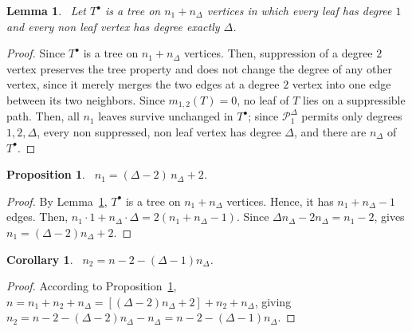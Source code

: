 \documentclass[12pt]{amsart}
\newtheorem{lemma}[theorem]{Lemma}
\newtheorem{proposition}[theorem]{Proposition}
\newtheorem{corollary}[theorem]{Corollary}
\begin{document}
\begin{lemma}~\label{lemreducedtreedegrees501}
Let $T^\bullet$ is a tree on $n_1+n_\Delta$ vertices in which every leaf has degree $1$ and every non leaf vertex has degree exactly $\Delta$.
\end{lemma}
\begin{proof}
Since $T^\bullet$ is a tree on $n_1+n_\Delta$ vertices. Then, suppression of a degree $2$ vertex preserves the tree property and does not change the degree of any other vertex, since it merely merges the two edges at a degree $2$ vertex into one edge between its two neighbors. Since $m_{1,2}(T)=0$, no leaf of $T$ lies on a suppressible path. Then,  all $n_1$ leaves survive unchanged in $T^\bullet$; since $\mathcal P_1^\Delta$ permits only degrees $1,2,\Delta$, every non suppressed, non leaf vertex has degree $\Delta$, and there are $n_\Delta$ of $T^\bullet$.
\end{proof}

\begin{proposition}~\label{prop001reducedtreeidentity}
$n_1 = (\Delta-2)\,n_\Delta + 2$.
\end{proposition}
\begin{proof}
By Lemma~\ref{lemreducedtreedegrees501}, $T^\bullet$ is a tree on
$n_1+n_\Delta$ vertices. Hence, it has $n_1+n_\Delta-1$ edges. Then, $n_1\cdot1 + n_\Delta\cdot\Delta = 2(n_1+n_\Delta-1).$ Since $\Delta n_\Delta - 2n_\Delta = n_1-2$, gives
$n_1=(\Delta-2)n_\Delta+2$.
\end{proof}

\begin{corollary}~\label{cor002n2formula}
$n_2=n - 2 - (\Delta-1)n_\Delta$.
\end{corollary}
\begin{proof}
According to Proposition~\ref{prop001reducedtreeidentity},  $n = n_1+n_2+n_\Delta =[(\Delta-2)n_\Delta+2]+n_2+n_\Delta$, giving
$n_2=n-2-(\Delta-2)n_\Delta-n_\Delta=n-2-(\Delta-1)n_\Delta$.
\end{proof}
\end{document}
